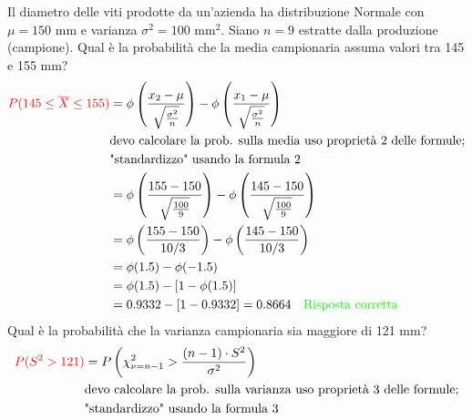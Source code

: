 \documentclass{article}  %
\theoremstyle{definition}
\begin{document}
\begin{esercizio}[Esercizio]
	Il diametro delle viti prodotte da un'azienda ha distribuzione Normale con $\mu = 150$ mm e varianza $\sigma^2=100$ mm$^2$. Siano $n=9$
	estratte dalla produzione (campione). Qual è la probabilità che la media campionaria assuma valori tra 145 e 155 mm?
	\begin{align*}
		\textcolor{red}{P(145 \leq \overline{X} \leq 155)} & = \phi\left(\frac{x_2-\mu}{\sqrt{\frac{\sigma^2}{n}}}\right) - \phi\left(\frac{x_1-\mu}{\sqrt{\frac{\sigma^2}{n}}}\right) \\
		                                                   & \text{devo calcolare la prob. sulla media uso proprietà 2 delle formule;}                                                 \\
		                                                   & \text{"standardizzo" usando la formula 2}                                                                                 \\
		                                                   & =  \phi\left(\frac{155-150}{\sqrt{\frac{100}{9}}}\right) - \phi\left(\frac{145-150}{\sqrt{\frac{100}{9}}}\right)          \\
		                                                   & =  \phi\left(\frac{155-150}{10/3}\right) - \phi\left(\frac{145-150}{10/3}\right)                                          \\
		                                                   & =  \phi(1.5) - \phi(-1.5)                                                                                                 \\
		                                                   & =  \phi(1.5) - [1-\phi(1.5)]                                                                                              \\
		                                                   & =  0.9332 - [1-0.9332] = 0.8664 \quad \textcolor{green}{\text{Risposta corretta}}
	\end{align*}
	Qual è la probabilità che la varianza campionaria sia maggiore di 121 mm?
	\begin{align*}
		\textcolor{red}{P(S^2>121)} & = P\left(\chi^2_{\nu=n-1} > \frac{(n-1)\cdot S^2}{\sigma^2}\right)           \\
		                            & \text{devo calcolare la prob. sulla varianza uso proprietà 3 delle formule;} \\
		                            & \text{"standardizzo" usando la formula 3}                                    \\

\end{align*}
\end{esercizio}
\end{document}
